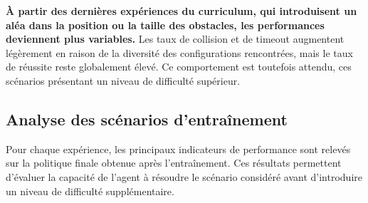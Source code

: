 \vspace{10pt}

\noindent \textbf{À partir des dernières expériences du curriculum, qui introduisent un aléa dans la position ou la taille des obstacles, les performances deviennent plus variables.} Les taux de collision et de timeout augmentent légèrement en raison de la diversité des configurations rencontrées, mais le taux de réussite reste globalement élevé. Ce comportement est toutefois attendu, ces scénarios présentant un niveau de difficulté supérieur.




\subsection{Analyse des scénarios d'entraînement}

\noindent Pour chaque expérience, les principaux indicateurs de performance sont relevés sur la politique finale obtenue après l'entraînement. Ces résultats permettent d'évaluer la capacité de l'agent à résoudre le scénario considéré avant d'introduire un niveau de difficulté supplémentaire.

